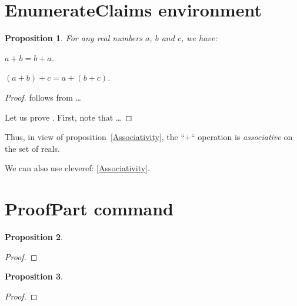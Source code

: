 \documentclass{article}
\newtheorem{proposition}{Proposition}
\begin{document}
  \section{EnumerateClaims environment}

  \begin{proposition}
    For any real numbers $a$, $b$ and $c$, we have:
    \begin{EnumerateClaims}
      \item\label{Commutativity} $a + b = b + a$.
      \item\label{Associativity} $(a + b) + c = a + (b + c)$.
    \end{EnumerateClaims}
  \end{proposition}

  \begin{proof}
     follows from \dots

    Let us prove . First, note that \dots
  \end{proof}

  Thus, in view of proposition~\ref{Associativity}, the ``$+$`` operation is \emph{associative} on the set of reals.

  We can also use cleveref: \cref{Associativity}.


  \section{ProofPart command}

  \begin{proposition}
    \lipsum[5][1]
  \end{proposition}

  \begin{proof}
    \ProofPart

    \lipsum[1][1-5]

    \lipsum[2][1-3]

    \lipsum[3][1-2]

    \ProofPart

    \lipsum[4][1-3]

    \lipsum[4][4-8]
  \end{proof}

  \begin{proposition}
    \lipsum[5][2]
  \end{proposition}

  \begin{proof}
    \ProofPart

    \lipsum[1][1-5]

    \lipsum[1][4-5]

    \ProofPart

    \lipsum[1][1-3]
  \end{proof}
\end{document}
